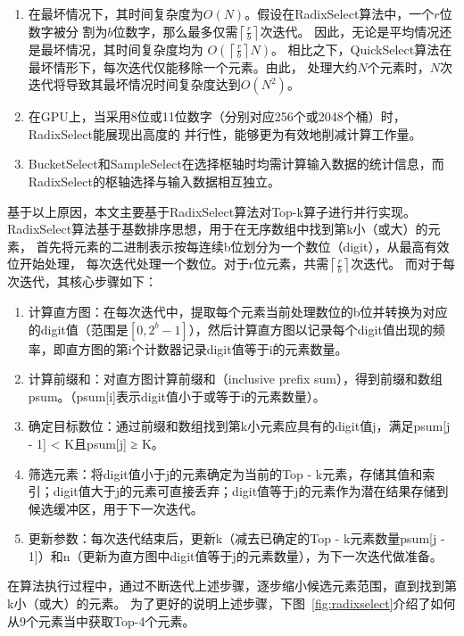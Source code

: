 \begin{enumerate}
\item 在最坏情况下，其时间复杂度为$O(N)$。假设在RadixSelect算法中，一个$r$位数字被分
割为$b$位数字，那么最多仅需$\left\lceil\frac{r}{b}\right\rceil$次迭代。
因此，无论是平均情况还是最坏情况，其时间复杂度均为
$O(\left\lceil\frac{r}{b}\right\rceil N)$。
相比之下，QuickSelect算法在最坏情形下，每次迭代仅能移除一个元素。由此，
处理大约$N$个元素时，$N$次迭代将导致其最坏情况时间复杂度达到$O(N^{2})$。

\item 在GPU上，当采用8位或11位数字（分别对应256个或2048个桶）时，RadixSelect能展现出高度的
并行性，能够更为有效地削减计算工作量。

\item BucketSelect和SampleSelect在选择枢轴时均需计算输入数据的统计信息，而RadixSelect的枢轴选择与输入数据相互独立\cite{zhang2023parallel}。

\end{enumerate}
基于以上原因，本文主要基于RadixSelect算法对Top-k算子进行并行实现。
RadixSelect算法基于基数排序思想，用于在无序数组中找到第k小（或大）的元素，
首先将元素的二进制表示按每连续b位划分为一个数位（digit），从最高有效位开始处理，
每次迭代处理一个数位。对于r位元素，共需$\left\lceil\frac{r}{b}\right\rceil$次迭代。
而对于每次迭代，其核心步骤如下：
\begin{enumerate}
    
    \item  {计算直方图}：在每次迭代中，提取每个元素当前处理数位的b位并转换为对应的digit值（范围是$[0, 2^{b}-1]$），然后计算直方图以记录每个digit值出现的频率，即直方图的第i个计数器记录digit值等于i的元素数量。
    \item  {计算前缀和}：对直方图计算前缀和（inclusive prefix sum），得到前缀和数组psum。（psum[i]表示digit值小于或等于i的元素数量）。
    \item  {确定目标数位}：通过前缀和数组找到第k小元素应具有的digit值j，满足psum[j - 1] < K且psum[j] ≥ K。
    \item  {筛选元素}：将digit值小于j的元素确定为当前的Top - k元素，存储其值和索引；digit值大于j的元素可直接丢弃；digit值等于j的元素作为潜在结果存储到候选缓冲区，用于下一次迭代。
    \item  {更新参数}：每次迭代结束后，更新k（减去已确定的Top - k元素数量psum[j - 1]）和n（更新为直方图中digit值等于j的元素数量），为下一次迭代做准备。
\end{enumerate}
在算法执行过程中，通过不断迭代上述步骤，逐步缩小候选元素范围，直到找到第k小（或大）的元素。
为了更好的说明上述步骤，下图~\ref{fig:radixselect}介绍了如何从9个元素当中获取Top-4个元素。

